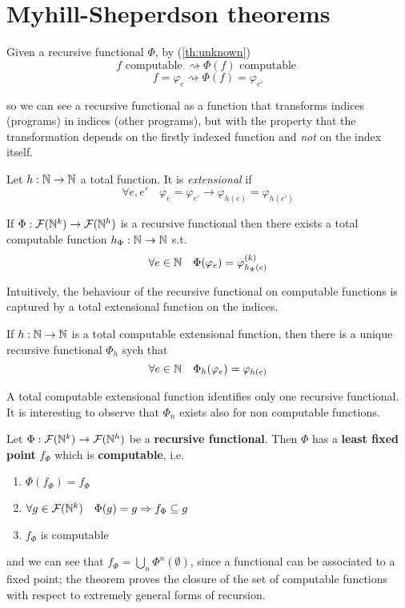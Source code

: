 \section{Myhill-Sheperdson theorems}
Given a recursive functional $\Phi$, by (\ref{th:unknown})
\[
  f \mbox{ computable } \rightsquigarrow \Phi(f) \mbox{ computable }
\]
\[
  f = \varphi_e \rightsquigarrow \Phi(f) = \varphi_{e'}
\]

so we can see a recursive functional as a function that transforms
indices (programs) in indices (other programs), but with the property
that the transformation depends on the firstly indexed function and
\emph{not} on the index itself.

\begin{definition}
  Let $h : \mathbb{N} \to \mathbb{N}$ a total function. It is \emph{extensional} if
  \[
    \forall e,e' \quad \varphi_e = \varphi_{e'} \to
    \varphi_{h(e)} = \varphi_{h(e')}
  \]
\end{definition}

\begin{theorem}
  If $\Phi : \mathcal{F}(\mathbb{N}^k) \to \mathcal{F}(\mathbb{N}^h)$ is a
  recursive functional then there exists a total computable function
  $h_\Phi : \mathbb{N} \to \mathbb{N}$ s.t.
  \[
    \forall e\in \mathbb{N} \quad \Phi(\varphi_e) = \varphi_{h_\Phi(e)}^{(k)}
  \]
\end{theorem}

Intuitively, the behaviour of the recursive functional on computable
functions is captured by a total extensional function on the
indices.

\begin{theorem}\label{th:myhill-shepherdson2}
  If $h : \mathbb{N} \to \mathbb{N}$ is a total computable extensional function, then
  there is a unique recursive functional $\Phi_h$ sych that
  \[
    \forall e \in \mathbb{N} \quad \Phi_h(\varphi_e) = \varphi_{h(e)}
  \]
\end{theorem}

A total computable extensional function identifies
only one recursive functional. It is interesting to observe that
$\Phi_n$ exists also for non computable functions.

\begin{theorem}\label{th:first-recursion}
  Let $\Phi : \mathcal{F}(\mathbb{N}^k) \to \mathcal{F}(\mathbb{N}^h)$ be
  a \textbf{recursive functional}. Then $\Phi$ has a \textbf{least fixed point}
  $f_\Phi$ which is \textbf{computable}, i.e.
  \begin{enumerate}
  \item $\Phi(f_\Phi) = f_\Phi$
  \item $\forall g \in \mathcal{F}(\mathbb{N}^k) \quad \Phi(g) = g \Rightarrow f_\Phi \subseteq g$
  \item $f_\Phi$ is computable
  \end{enumerate}
  and we can see that $f_\Phi = \bigcup\limits_n
  \Phi^{n}(\emptyset)$, since a functional can be associated to a
  fixed point; the theorem proves the closure of the set of computable
  functions with respect to extremely general forms of recursion.
\end{theorem}

